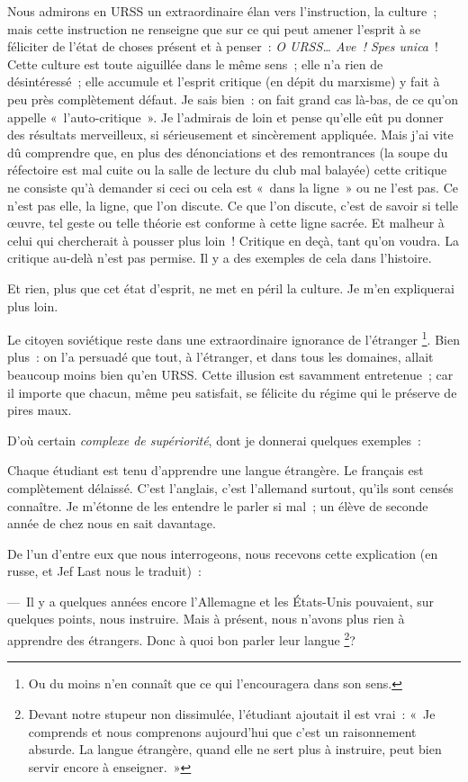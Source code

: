 \documentclass[french,twoside]{book} %
\begin{document}
Nous admirons en URSS un extraordinaire élan vers l’instruction, la culture ; mais cette instruction ne renseigne que sur ce qui peut amener l’esprit à se féliciter de l’état de choses présent et à penser : \emph{O URSS… Ave ! Spes unica} ! Cette culture est toute aiguillée dans le même sens ; elle n’a rien de désintéressé ; elle accumule et l’esprit critique (en dépit du marxisme) y fait à peu près complètement défaut. Je sais bien : on fait grand cas là-bas, de ce qu’on appelle « l’auto-critique ». Je l’admirais de loin et pense qu’elle eût pu donner des résultats merveilleux, si sérieusement et sincèrement appliquée. Mais j’ai vite dû comprendre que, en plus des dénonciations et des remontrances (la soupe du réfectoire est mal cuite ou la salle de lecture du club mal balayée) cette critique ne consiste qu’à demander si ceci ou cela est « dans la ligne » ou ne l’est pas. Ce n’est pas elle, la ligne, que l’on discute. Ce que l’on discute, c’est de savoir si telle œuvre, tel geste ou telle théorie est conforme à cette ligne sacrée. Et malheur à celui qui chercherait à pousser plus loin ! Critique en deçà, tant qu’on voudra. La critique au-delà n’est pas permise. Il y a des exemples de cela dans l’histoire.\par
Et rien, plus que cet état d’esprit, ne met en péril la culture. Je m’en expliquerai plus loin.\par
Le citoyen soviétique reste dans une extraordinaire ignorance de l’étranger \footnote{Ou du moins n’en connaît que ce qui l’encouragera dans son sens.}. Bien plus : on l’a persuadé que tout, à l’étranger, et dans tous les domaines, allait beaucoup moins bien qu’en URSS. Cette illusion est savamment entretenue ; car il importe que chacun, même peu satisfait, se félicite du régime qui le préserve de pires maux.\par
D’où certain \emph{complexe de supériorité}, dont je donnerai quelques exemples :\par
Chaque étudiant est tenu d’apprendre une langue étrangère. Le français est complètement délaissé. C’est l’anglais, c’est l’allemand surtout, qu’ils sont censés connaître. Je m’étonne de les entendre le parler si mal ; un élève de seconde année de chez nous en sait davantage.\par
De l’un d’entre eux que nous interrogeons, nous recevons cette explication (en russe, et Jef Last nous le traduit) :\par
— Il y a quelques années encore l’Allemagne et les États-Unis pouvaient, sur quelques points, nous instruire. Mais à présent, nous n’avons plus rien à apprendre des étrangers. Donc à quoi bon parler leur langue \footnote{Devant notre stupeur non dissimulée, l’étudiant ajoutait il est vrai : « Je comprends et nous comprenons aujourd’hui que c’est un raisonnement absurde. La langue étrangère, quand elle ne sert plus à instruire, peut bien servir encore à enseigner. »}?\par
\end{document}
